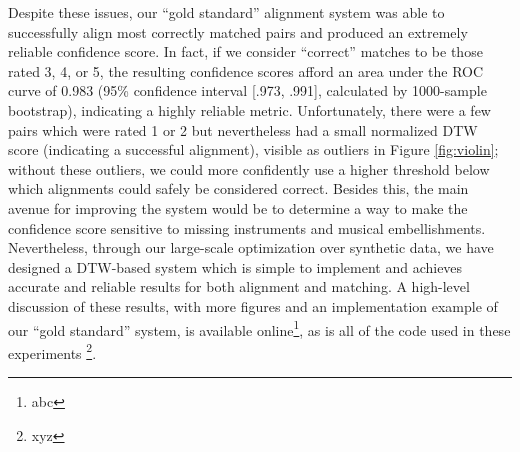 \documentclass{article}
\begin{document}
Despite these issues, our ``gold standard'' alignment system was able to successfully align most correctly matched pairs and produced an extremely reliable confidence score.
In fact, if we consider ``correct'' matches to be those rated 3, 4, or 5, the resulting confidence scores afford an area under the ROC curve of 0.983 (95\% confidence interval [.973, .991], calculated by 1000-sample bootstrap), indicating a highly reliable metric.
Unfortunately, there were a few pairs which were rated 1 or 2 but nevertheless had a small normalized DTW score (indicating a successful alignment), visible as outliers in Figure \ref{fig:violin}; without these outliers, we could more confidently use a higher threshold below which alignments could safely be considered correct.
Besides this, the main avenue for improving the system would be to determine a way to make the confidence score sensitive to missing instruments and musical embellishments.
Nevertheless, through our large-scale optimization over synthetic data, we have designed a DTW-based system which is simple to implement and achieves accurate and reliable results for both alignment and matching.
A high-level discussion of these results, with more figures and an implementation example of our ``gold standard'' system, is available online\footnote{abc}, as is all of the code used in these experiments \footnote{xyz}.



\end{document}
